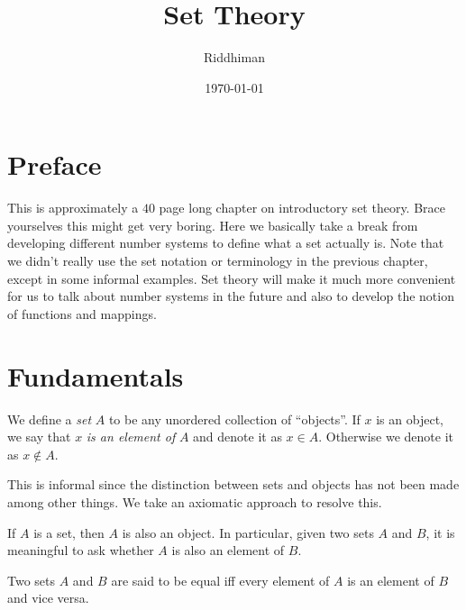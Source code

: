 \documentclass[12pt]{article}
\title{Set Theory}
\author{Riddhiman}
\date{\monthyeardate\today}
\theoremstyle{remark}
\begin{document}
\def\inc{{\mathrel+\joinrel\mathrel+}}  

\maketitle

\section{Preface}%
\label{sec:Preface}

This is approximately a $ 40 $ page long chapter on introductory set theory. Brace yourselves this might get very boring. Here we basically take a break from developing different number systems to define what a set actually is. Note that we didn't really use the set notation or terminology in the previous chapter, except in some informal examples. Set theory will make it much more convenient for us to talk about number systems in the future and also to develop the notion of functions and mappings.  

\section{Fundamentals}%
\label{sec:Fundamentals}
 
\begin{definition}[Informal]
	We define a \textit{set} $ A $ to be any unordered collection of ``objects''. If $ x $ is an object, we say that $ x $ \textit{is an element of} $ A $ and denote it as $ x \in A $. Otherwise we denote it as $ x \notin A $.
\end{definition}
 
This is informal since the distinction between sets and objects has not been made among other things. We take an axiomatic approach to resolve this. 


\begin{important}
     If $ A $ is a set, then $ A $ is also an object. In particular, given two sets $ A $ and $ B $, it is meaningful to ask whether $ A $ is also an element of $ B $. 
\end{important}

\begin{definition}
    Two sets $ A $ and $ B $ are said to be equal iff every element of $ A $ is an element of $ B $ and vice versa.
\end{definition}
\end{document}
